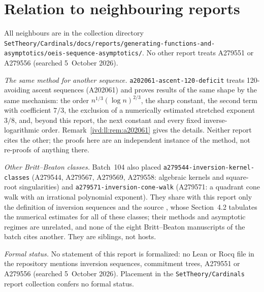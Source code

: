 \documentclass[11pt,letterpaper]{article}
\theoremstyle{remark}\newtheorem{remark}[theorem]{Remark}
\numberwithin{equation}{section}
\newcommand{\file}[1]{\nolinkurl{#1}}
\begin{document}
\section*{Relation to neighbouring reports}\label{ivd:sec:neighbours}
All neighbours are in the collection directory \file{SetTheory/Cardinals/docs/reports/generating-functions-and-asymptotics/}\allowbreak\file{oeis-sequence-asymptotics/}. No other report treats A279551 or A279556 (searched 5~October 2026).

\emph{The same method for another sequence.} \file{a202061-ascent-120-deficit} treats 120-avoiding ascent sequences (A202061) and proves results of the same shape by the same mechanism: the order $n^{1/3}(\log n)^{2/3}$, the sharp constant, the second term with coefficient $7/3$, the exclusion of a numerically estimated stretched exponent $3/8$, and, beyond this report, the next constant and every fixed inverse-logarithmic order. Remark~\ref{ivd:ll:rem:a202061} gives the details. Neither report cites the other; the proofs here are an independent instance of the method, not re-proofs of anything there.

\emph{Other Britt--Beaton classes.} Batch~104 also placed \file{a279544-inversion-kernel-classes} (A279544, A279567, A279569, A279558: algebraic kernels and square-root singularities) and \file{a279571-inversion-cone-walk} (A279571: a quadrant cone walk with an irrational polynomial exponent). They share with this report only the definition of inversion sequences and the source \cite{BB}, whose Section~4.2 tabulates the numerical estimates for all of these classes; their methods and asymptotic regimes are unrelated, and none of the eight Britt--Beaton manuscripts of the batch cites another. They are siblings, not hosts.

\emph{Formal status.} No statement of this report is formalized: no Lean or Rocq file in the repository mentions inversion sequences, commitment trees, A279551 or A279556 (searched 5~October 2026). Placement in the \file{SetTheory/Cardinals} report collection confers no formal status.

\clearpage
\end{document}
